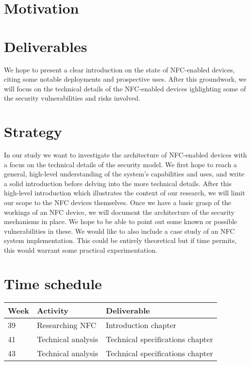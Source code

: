 \documentclass[11pt]{article} %
\begin{document}
\section{Motivation}

\section{Deliverables}
We hope to present a clear introduction on the state of NFC-enabled devices, citing some notable deployments and prospective uses.
After this groundwork, we will focus on the technical details of the NFC-enabled devices ighlighting some of the security vulnerabilities and risks involved.

\section{Strategy}
In our study we want to investigate the architecture of NFC-enabled devices with a focus on the technical details of the security model. We first hope to reach a general, high-level understanding of the system's capabilities and uses, and write a solid introduction before delving into the more technical details. After this high-level introduction which illustrates the context of our research, we will limit our scope to the NFC devices themselves.
Once we have a basic grasp of the workings of an NFC device, we will document the architecture of the security mechanisms in place. We hope to be able to point out some known or possible vulnerabilities in these.
We would like to also include a case study of an NFC system implementation. This could be entirely theoretical but if time permits, this would warrant some practical experimentation.

\section{Time schedule}
\begin{center}
  \begin{tabular}{ |l| l || l | }
    \hline
    Week & Activity & Deliverable \\ \hline
    39 & Researching NFC & Introduction chapter \\ \hline
    41 & Technical analysis & Technical specifications chapter \\ \hline
    43 & Technical analysis & Technical specifications chapter \\ \hline
  \end{tabular}
\end{center}


\end{document}
